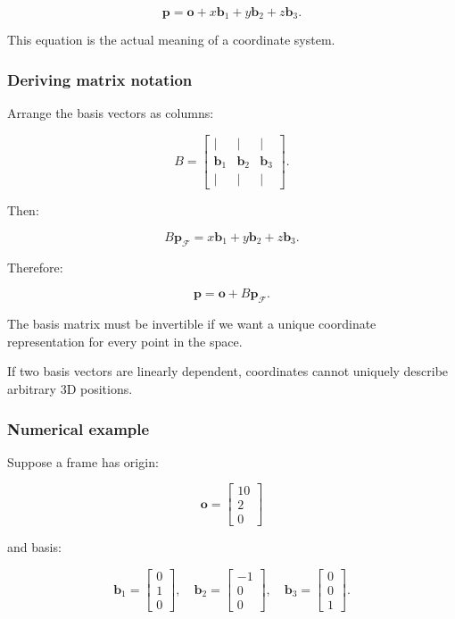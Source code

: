 \[
 \boxed{ \mathbf p= \mathbf o+x\mathbf b_1+y\mathbf b_2+z\mathbf b_3 }.
\]

This equation is the actual meaning of a coordinate system.

\subsubsection{Deriving matrix notation}\label{02-foundations-ii-ch032-deriving-matrix-notation}

\hypertarget{02-foundations-ii-ch032-deriving-matrix-notation}{}

Arrange the basis vectors as columns:

\[
 B= \begin{bmatrix} |&|&|\\ \mathbf b_1&\mathbf b_2&\mathbf b_3\\ |&|&| \end{bmatrix}.
\]

Then:

\[
 B\mathbf p_{\mathcal F} = x\mathbf b_1+y\mathbf b_2+z\mathbf b_3.
\]

Therefore:

\[
 \boxed{ \mathbf p=\mathbf o+B\mathbf p_{\mathcal F} }.
\]

The basis matrix must be invertible if we want a unique coordinate representation for every point in the space.

If two basis vectors are linearly dependent, coordinates cannot uniquely describe arbitrary 3D positions.

\subsubsection{Numerical example}\label{02-foundations-ii-ch032-numerical-example}

\hypertarget{02-foundations-ii-ch032-numerical-example}{}

Suppose a frame has origin:

\[
 \mathbf o= \begin{bmatrix}10\\2\\0\end{bmatrix}
\]

and basis:

\[
 \mathbf b_1= \begin{bmatrix}0\\1\\0\end{bmatrix},\quad \mathbf b_2= \begin{bmatrix}-1\\0\\0\end{bmatrix},\quad \mathbf b_3= \begin{bmatrix}0\\0\\1\end{bmatrix}.
\]

